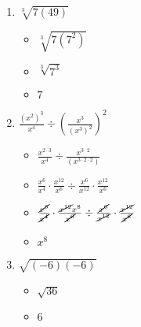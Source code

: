 \documentclass{article}
\begin{document}
\begin{onehalfspace}
\begin{enumerate}[start=69]
        \item $\sqrt[3]{7(49)}$
        \begin{itemize}
            \item $\sqrt[3]{7(7^{2})}$
            \item $\sqrt[3]{7^{3}}$
            \item $7$
        \end{itemize}

        \item $\frac{(x^{2})^{3}}{x^{4}} \div \left( \frac{x^{3}}{(x^{3})^{2}} \right)^{2}$
        \begin{itemize}
            \item $\frac{x^{2 \cdot 3}}{x^{4}} \div \frac{x^{3 \cdot 2}}{(x^{3 \cdot 2 \cdot 2})}$
            \item $\frac{x^{6}}{x^{4}} \cdot \frac{x^{12}}{x^{6}} \div \frac{x^{6}}{x^{12}} \cdot \frac{x^{12}}{x^{6}}$
            \item $\frac{\cancel{x^{6}}}{\cancel{x^{4}}} \cdot \frac{\cancel{x^{12}} x^{8}}{\cancel{x^{6}}} \div \frac{\cancel{x^{6}}}{\cancel{x^{12}}} \cdot \frac{\cancel{x^{12}}}{\cancel{x^{6}}}$
            \item $x^{8}$
        \end{itemize}

        \item $\sqrt{(-6)(-6)}$
        \begin{itemize}
            \item $\sqrt{36}$
            \item $6$
        \end{itemize}
     \end{enumerate}
\end{onehalfspace}
\end{document}
